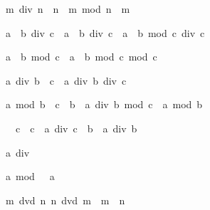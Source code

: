 \begin{isabellebody}
\begin{isamarkuptext}
\begin{isabelle}%
m\ div\ n\ {\isacharasterisk}\ n\ {\isacharplus}\ m\ mod\ n\ {\isacharequal}\ m%
\end{isabelle}


\begin{isabelle}%
a\ {\isacharasterisk}\ b\ div\ c\ {\isacharequal}\ a\ {\isacharasterisk}\ {\isacharparenleft}b\ div\ c{\isacharparenright}\ {\isacharplus}\ a\ {\isacharasterisk}\ {\isacharparenleft}b\ mod\ c{\isacharparenright}\ div\ c%
\end{isabelle}

\begin{isabelle}%
a\ {\isacharasterisk}\ b\ mod\ c\ {\isacharequal}\ a\ {\isacharasterisk}\ {\isacharparenleft}b\ mod\ c{\isacharparenright}\ mod\ c%
\end{isabelle}

\begin{isabelle}%
a\ div\ {\isacharparenleft}b\ {\isacharasterisk}\ c{\isacharparenright}\ {\isacharequal}\ a\ div\ b\ div\ c%
\end{isabelle}

\begin{isabelle}%
a\ mod\ {\isacharparenleft}b\ {\isacharasterisk}\ c{\isacharparenright}\ {\isacharequal}\ b\ {\isacharasterisk}\ {\isacharparenleft}a\ div\ b\ mod\ c{\isacharparenright}\ {\isacharplus}\ a\ mod\ b%
\end{isabelle}

\begin{isabelle}%
{}\ {\isacharless}\ c\ {\isasymLongrightarrow}\ c\ {\isacharasterisk}\ a\ div\ {\isacharparenleft}c\ {\isacharasterisk}\ b{\isacharparenright}\ {\isacharequal}\ a\ div\ b%
\end{isabelle}

\begin{isabelle}%
a\ div\ {}\ {\isacharequal}\ {}%
\end{isabelle}

\begin{isabelle}%
a\ mod\ {}\ {\isacharequal}\ a%
\end{isabelle}

\begin{isabelle}%
{\isasymlbrakk}m\ dvd\ n{\isacharsemicolon}\ n\ dvd\ m{\isasymrbrakk}\ {\isasymLongrightarrow}\ m\ {\isacharequal}\ n%
\end{isabelle}


\end{isamarkuptext}
\end{isabellebody}
